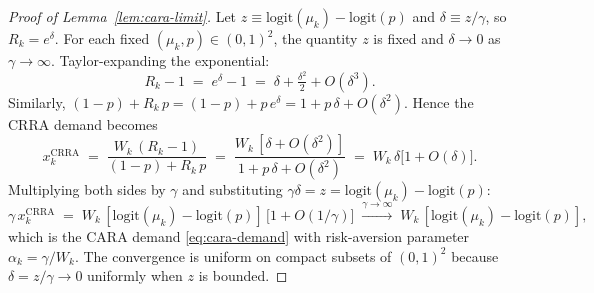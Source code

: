 \documentclass[12pt,letterpaper]{article}
\theoremstyle{definition}
\theoremstyle{remark}
\newcommand{\logit}{\mathrm{logit}}
\newcommand{\1}{\mathbf{1}}
\begin{document}
\begin{proof}[Proof of Lemma~\ref{lem:cara-limit}]
Let $z\equiv\logit(\mu_{k})-\logit(p)$ and $\delta\equiv z/\gamma$, so
$R_{k}=e^{\delta}$. For each fixed $(\mu_{k},p)\in(0,1)^{2}$, the
quantity $z$ is fixed and $\delta\to 0$ as $\gamma\to\infty$.
Taylor-expanding the exponential:
\[
   R_{k}-1 \;=\; e^{\delta}-1
   \;=\; \delta+\tfrac{\delta^{2}}{2}+O(\delta^{3}).
\]
Similarly, $(1-p)+R_{k}\,p = (1-p)+p\,e^{\delta}
= 1 + p\,\delta + O(\delta^{2})$. Hence the CRRA demand becomes
\[
   x_{k}^{\mathrm{CRRA}}
   \;=\; \frac{W_{k}\,(R_{k}-1)}{(1-p)+R_{k}\,p}
   \;=\; \frac{W_{k}\,[\delta+O(\delta^{2})]}{1+p\,\delta+O(\delta^{2})}
   \;=\; W_{k}\,\delta\bigl[1+O(\delta)\bigr].
\]
Multiplying both sides by $\gamma$ and substituting
$\gamma\delta=z=\logit(\mu_{k})-\logit(p)$:
\[
   \gamma\,x_{k}^{\mathrm{CRRA}}
   \;=\; W_{k}\,[\logit(\mu_{k})-\logit(p)]\,\bigl[1+O(1/\gamma)\bigr]
   \;\xrightarrow{\gamma\to\infty}\;
   W_{k}\,[\logit(\mu_{k})-\logit(p)],
\]
which is the CARA demand \eqref{eq:cara-demand} with risk-aversion
parameter $\alpha_{k}=\gamma/W_{k}$. The convergence is uniform on
compact subsets of $(0,1)^{2}$ because $\delta=z/\gamma\to 0$ uniformly
when $z$ is bounded.
\end{proof}
\end{document}
